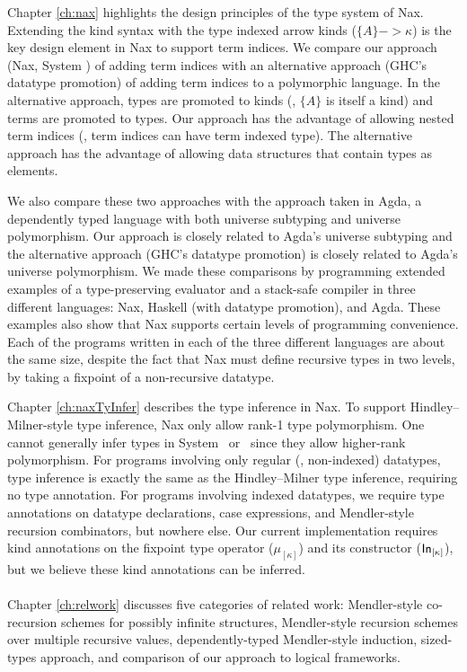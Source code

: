 Chapter \ref{ch:nax} highlights the design principles of the type system of Nax.
Extending the kind syntax with the type indexed arrow kinds ($\{A\} -> \kappa$) 
is the key design element in Nax to support term indices.
We compare our approach (Nax, System \Fi) of adding term indices with
an alternative approach (GHC's datatype promotion) of adding
term indices to a polymorphic language. In the alternative approach,
types are promoted to kinds (\ie, $\{A\}$ is itself a kind) and
terms are promoted to types. Our approach has the advantage of
allowing nested term indices (\ie, term indices can have term indexed type).
The alternative approach has the advantage of allowing data structures that
contain types as elements.

We also compare these two approaches with the approach taken in Agda,
a dependently typed language with both universe subtyping and
universe polymorphism. Our approach is closely related to
Agda's universe subtyping and the alternative approach
(GHC's datatype promotion) is closely related to Agda's universe polymorphism.
We made these comparisons by programming extended examples of
a type-preserving evaluator and a stack-safe compiler
in three different languages: Nax, Haskell (with datatype promotion), and Agda.
These examples also show that Nax supports certain levels of
programming convenience. Each of the programs written
in each of the three different languages are about the same size,
despite the fact that Nax must define recursive types in two levels,
by taking a fixpoint of a non-recursive datatype.

Chapter \ref{ch:naxTyInfer} describes the type inference in Nax.
To support Hindley--Milner-style type inference, Nax only
allow rank-1 type polymorphism. One cannot generally infer types
in System \Fi\ or \Fixi\ since they allow higher-rank polymorphism.
For programs involving only regular (\ie, non-indexed) datatypes,
type inference is exactly the same as the Hindley--Milner type inference,
requiring no type annotation. For programs involving indexed datatypes,
we require type annotations on datatype declarations, case expressions, and
Mendler-style recursion combinators, but nowhere else.
Our current implementation requires kind annotations on
the fixpoint type operator ($\mu_{[\kappa]}$) and its constructor
($\mathsf{In}_{[\kappa]}$), but we believe these kind annotations can be inferred.

\paragraph{}
Chapter \ref{ch:relwork} discusses five categories of related work:
Mendler-style co-recursion schemes for possibly infinite structures,
Mendler-style recursion schemes over multiple recursive values,
dependently-typed Mendler-style induction, sized-types approach,
and comparison of our approach to logical frameworks.

